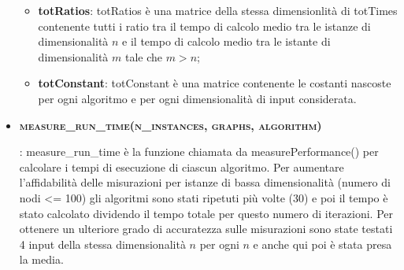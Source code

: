 \begin{itemize}
\begin{itemize}
        \item\textbf{totRatios}: totRatios è una matrice della stessa dimensionlità di totTimes contenente tutti i ratio tra il tempo di calcolo medio tra le istanze di dimensionalità $n$ e il tempo di calcolo medio tra le istante di dimensionalità $m$ tale che $m>n$;
        
        \item  \textbf{totConstant}: totConstant è una matrice contenente le costanti nascoste per ogni algoritmo e per ogni dimensionalità di input considerata.
    \end{itemize}
    
    \item \hypertarget{measureruntime}{\textbf{\textsc{measure\_run\_time(n\_instances, graphs, algorithm)}}}: measure\_run\_time è la funzione chiamata da  measurePerformance() per calcolare i tempi di esecuzione di ciascun algoritmo. Per aumentare l'affidabilità delle misurazioni per istanze di bassa dimensionalità (numero di nodi <= 100) gli algoritmi sono stati ripetuti più volte (30) e poi il tempo è stato calcolato dividendo il tempo totale per questo numero di iterazioni. Per ottenere un ulteriore grado di accuratezza sulle misurazioni sono state testati 4 input della stessa dimensionalità $n$ per ogni $n$ e anche qui poi è stata presa la media.
\end{itemize}


\newpage